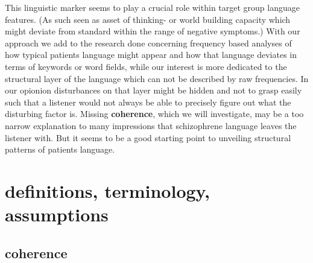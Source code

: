 \documentclass[
  12pt,
  oneside]{book}
\begin{document}
This linguistic marker seems to play a crucial role within target group language features. (As such seen as asset of thinking- or world building capacity which might deviate from standard within the range of negative symptoms.) With our approach we add to the research done concerning frequency based analyses of how typical patients language might appear and how that language deviates in terms of keywords or word fields, while our interest is more dedicated to the structural layer of the language which can not be described by raw frequencies. In our opionion disturbances on that layer might be hidden and not to grasp easily such that a listener would not always be able to precisely figure out what the disturbing factor is. Missing \textbf{coherence}, which we will investigate, may be a too narrow explanation to many impressions that schizophrene language leaves the listener with. But it seems to be a good starting point to unveiling structural patterns of patients language.

\section{definitions, terminology, assumptions}\label{definitions-terminology-assumptions}

\subsection{coherence}\label{coherence}
\end{document}
